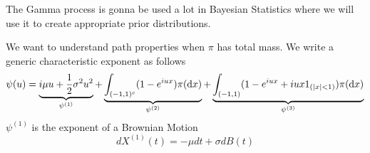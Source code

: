 \documentclass[class=article,crop=false]{standalone}
\begin{document}
\begin{remark}
	The Gamma process is gonna be used a lot in Bayesian Statistics where we will use it to create appropriate prior distributions. 
\end{remark}
We want to understand path properties when $\pi$ has total mass. We write a generic characteristic exponent as follows
\begin{equation*}
	\psi(u)  = \underbrace{i\mu u + \frac{1}{2}\sigma^2 u^2}_{\psi^{(1)}} + \underbrace{\int_{(-1,1)^c}(1-e^{iux})\pi(\mathop{}\!\mathrm{d} x)}_{\psi^{(2)}} + \underbrace{\int_{(-1,1)}(1-e^{iux} + iux 1_{(|x|<1)})\pi(\mathop{}\!\mathrm{d} x)}_{\psi^{(3)}}
\end{equation*}
$\psi^{(1)}$ is the exponent of a Brownian Motion
\begin{equation*}
	d X^{(1)}(t) = - \mu dt + \sigma dB(t) 
\end{equation*}
\end{document}
